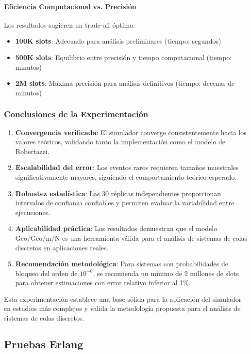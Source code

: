 \documentclass{article}
\begin{document}
\paragraph{Eficiencia Computacional vs. Precisión}
Los resultados sugieren un trade-off óptimo:
\begin{itemize}
    \item \textbf{100K slots}: Adecuado para análisis preliminares (tiempo: segundos)
    \item \textbf{500K slots}: Equilibrio entre precisión y tiempo computacional (tiempo: minutos)
    \item \textbf{2M slots}: Máxima precisión para análisis definitivos (tiempo: decenas de minutos)
\end{itemize}

\subsubsection{Conclusiones de la Experimentación}
\begin{enumerate}
    \item \textbf{Convergencia verificada}: El simulador converge consistentemente hacia los valores teóricos, validando tanto la implementación como el modelo de Robertazzi.
    \item \textbf{Escalabilidad del error}: Los eventos raros requieren tamaños muestrales significativamente mayores, siguiendo el comportamiento teórico esperado.
    \item \textbf{Robustez estadística}: Las 30 réplicas independientes proporcionan intervalos de confianza confiables y permiten evaluar la variabilidad entre ejecuciones.
    \item \textbf{Aplicabilidad práctica}: Los resultados demuestran que el modelo Geo/Geo/m/N es una herramienta válida para el análisis de sistemas de colas discretos en aplicaciones reales.
    \item \textbf{Recomendación metodológica}: Para sistemas con probabilidades de bloqueo del orden de $10^{-6}$, se recomienda un mínimo de 2 millones de slots para obtener estimaciones con error relativo inferior al 1\%.
\end{enumerate}

Esta experimentación establece una base sólida para la aplicación del simulador en estudios más complejos y valida la metodología propuesta para el análisis de sistemas de colas discretos.

\subsection{Pruebas Erlang}\label{subsec:pruebas_erlang}
\end{document}
